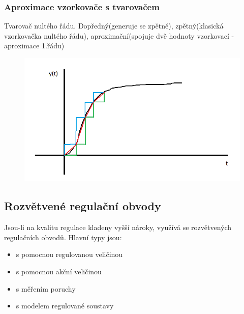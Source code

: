 \subsubsection*{Aproximace vzorkovače s tvarovačem}
Tvarovač nultého řádu. Dopředný(generuje se zpětně), zpětný(klasická vzorkovačka nultého řádu), aproximační(spojuje dvě hodnoty vzorkovací - aproximace 1.řádu)
\begin{figure}[H]
    \includegraphics*[scale = 1]{images/tvarovace.png}
\end{figure}

\subsection*{Rozvětvené regulační obvody}
Jsou-li na kvalitu regulace kladeny vyšší nároky, využívá se rozvětvených regulačních obvodů.
Hlavní typy jsou:
\begin{itemize}
    \item s pomocnou regulovanou veličinou
    \item s pomocnou akční veličinou
    \item s měřením poruchy
    \item s modelem regulované soustavy
\end{itemize}

